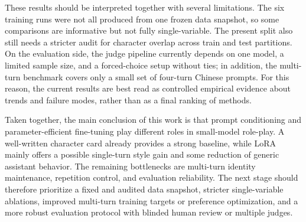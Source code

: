 \documentclass{article}
\begin{document}
These results should be interpreted together with several limitations. The six
training runs were not all produced from one frozen data snapshot, so some
comparisons are informative but not fully single-variable. The present split
also still needs a stricter audit for character overlap across train and test
partitions. On the evaluation side, the judge pipeline currently depends on one
model, a limited sample size, and a forced-choice setup without ties; in
addition, the multi-turn benchmark covers only a small set of four-turn Chinese
prompts. For this reason, the current results are best read as controlled
empirical evidence about trends and failure modes, rather than as a final
ranking of methods.

Taken together, the main conclusion of this work is that prompt conditioning
and parameter-efficient fine-tuning play different roles in small-model
role-play. A well-written character card already provides a strong baseline,
while LoRA mainly offers a possible single-turn style gain and some reduction
of generic assistant behavior. The remaining bottlenecks are multi-turn
identity maintenance, repetition control, and evaluation reliability. The next
stage should therefore prioritize a fixed and audited data snapshot, stricter
single-variable ablations, improved multi-turn training targets or preference
optimization, and a more robust evaluation protocol with blinded human review
or multiple judges.



\end{document}
